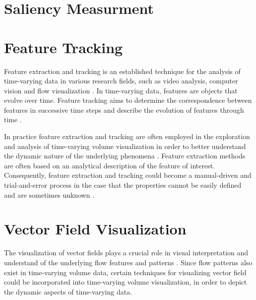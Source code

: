 \section{Saliency Measurment}

\cite{healey_combining_2001}
\cite{hall_trainable_2004}
\cite{carmi_causal_2006}
\cite{treue_visual_2003}
\cite{kadir_saliency_2001}

\cite{itti_model_1998}
\cite{harel_graph-based_2006}
\cite{cui_measuring_2006}
\cite{lee_mesh_2005}
\cite{duan_visual_2011}
\cite{kim_saliency-guided_2006}
\cite{shen_spatiotemporal_2015}

\section{Feature Tracking}
Feature extraction and tracking is an established technique for the analysis of time-varying data in various research fields, such as video analysis, computer vision and flow visualization \cite{muelder_interactive_2009}.
In time-varying data, features are objects that evolve over time. Feature tracking aims to determine the correspondence between features in successive time steps and describe the evolution of features through time \cite{post_state_2003}.

In practice feature extraction and tracking are often employed in the exploration and analysis of time-varying volume visualization in order to better understand the dynamic nature of the underlying phenomena \cite{tzeng_intelligent_2005} \cite{woodring_multiscale_2009} \cite{lee_visualizing_2009} \cite{gu_transgraph_2011}.
Feature extraction methods are often based on an analytical description of the feature of interest. Consequently, feature extraction and tracking could become a manual-driven and trial-and-error process in the case that the properties cannot be easily defined and are sometimes unknown \cite{ma_machine_2007}.

%
%

\section{Vector Field Visualization}
The visualization of vector fields plays a crucial role in visual interpretation and understand of the underlying flow features and patterns \cite{kuhn_clustering-based_2011} \cite{ma_coherent_2013}. Since flow patterns also exist in time-varying volume data, certain techniques for visualizing vector field could be incorporated into time-varying volume visualization, in order to depict the dynamic aspects of time-varying data.

